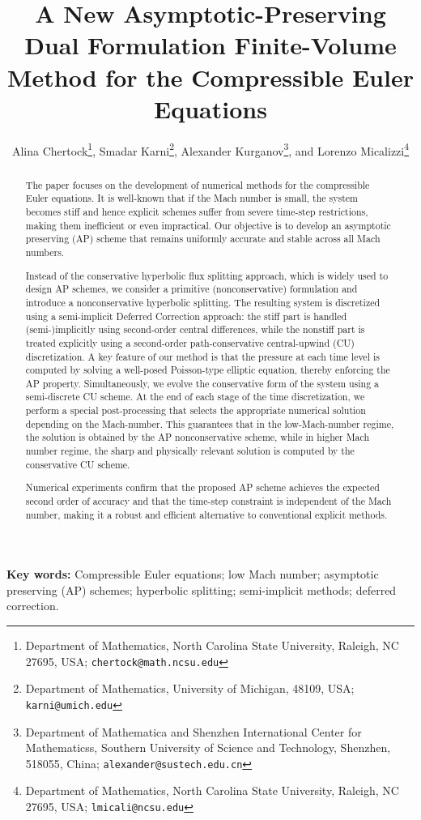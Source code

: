 \documentclass[A4paper,12pt,twoside]{article}
\title{A New Asymptotic-Preserving Dual Formulation Finite-Volume Method for the Compressible Euler Equations}
\author{Alina Chertock\thanks{Department of Mathematics, North Carolina State University, Raleigh, NC 27695, USA;
{\tt chertock@math.ncsu.edu}}, Smadar Karni\thanks{Department of Mathematics, University of Michigan, 48109, USA; {\tt karni@umich.edu}},
Alexander Kurganov\thanks{Department of Mathematica and Shenzhen International Center for Mathematicss, Southern University of Science and
Technology, Shenzhen, 518055, China; {\tt alexander@sustech.edu.cn}}, and Lorenzo Micalizzi\thanks{Department of Mathematics, North Carolina
State University, Raleigh, NC 27695, USA; {\tt lmicali@ncsu.edu}}}
\date{}
\numberwithin{equation}{section}
\numberwithin{figure}{section}
\numberwithin{table}{section}
\newcommand{\lore}[1]{{\leavevmode\color{red} #1}}
\begin{document}
\maketitle

\begin{abstract}
The paper focuses on the development of numerical methods for the compressible Euler equations. It is well-known that if the Mach number is
small, the system becomes stiff and hence explicit schemes suffer from severe time-step restrictions, making them inefficient or even
impractical. Our objective is to develop an asymptotic preserving (AP) scheme that remains uniformly accurate and stable across \lore{all} Mach numbers.

Instead of the conservative hyperbolic flux splitting approach, which is widely used to design AP schemes, we \lore{consider a primitive (nonconservative) formulation}
and introduce a nonconservative hyperbolic splitting. The resulting %
system is
discretized using a semi-implicit \lore{Deferred Correction} approach: the stiff part is handled \lore{(semi-)implicitly} using %
second-order central differences, while the
nonstiff part is treated \lore{explicitly} using a second-order path-conservative central-upwind (CU) \lore{discretization}. %
A key feature of our method is that
the pressure at each time level is computed by solving a \lore{well-posed} Poisson-type elliptic equation, thereby enforcing the AP property. Simultaneously,
we evolve the conservative form of the system using a semi-discrete CU \lore{scheme}. 
At the end of each \lore{stage of the time discretization},
we perform a special
post-processing that selects the appropriate numerical solution depending on the Mach-number. %
This guarantees that in the
low-Mach-number regime, the solution is obtained by the AP nonconservative scheme, while in higher Mach number regime, \lore{the} sharp and physically 
relevant solution is computed by the conservative CU scheme.

Numerical experiments confirm that the proposed AP scheme achieves the expected second order of accuracy and that the time-step constraint
is independent of the Mach number, making it a robust and efficient alternative to conventional explicit methods.
\end{abstract}

\noindent
{\bf Key words:} Compressible Euler equations; low Mach number; asymptotic preserving (AP) schemes; hyperbolic splitting; semi-implicit
methods; deferred correction.
\end{document}
